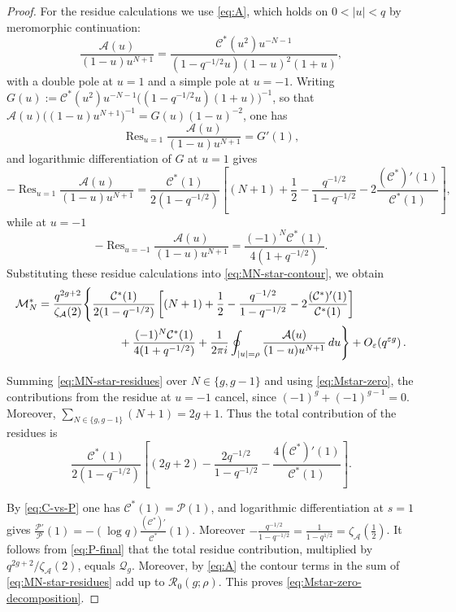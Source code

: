 \documentclass[a4paper,reqno]{amsart}
\numberwithin{equation}{section}
\theoremstyle{remark}
\theoremstyle{definition}
\newcommand{\A}{\mathcal{A}}
\newcommand{\zA}{\zeta_{\A}}
\begin{document}
\begin{proof}
For the residue calculations we use \eqref{eq:A}, which holds on
$0<|u|<q$ by meromorphic continuation:
$$
\frac{\mathcal A(u)}{(1-u)u^{N+1}}
=
\frac{\mathcal C^*(u^2)u^{-N-1}}
{(1-q^{-1/2}u)(1-u)^2(1+u)},
$$
with a double pole at $u=1$ and a simple pole at $u=-1$. Writing
$G(u):=\mathcal C^*(u^2)u^{-N-1}\bigl((1-q^{-1/2}u)(1+u)\bigr)^{-1}$, so
that $\mathcal A(u)\bigl((1-u)u^{N+1}\bigr)^{-1}=G(u)(1-u)^{-2}$, one has
$$
\operatorname{Res}_{u=1}\frac{\mathcal A(u)}{(1-u)u^{N+1}}=G'(1),
$$
and logarithmic differentiation of $G$ at $u=1$ gives
$$
-\operatorname{Res}_{u=1}
\frac{\mathcal A(u)}{(1-u)u^{N+1}}
=
\frac{\mathcal C^*(1)}{2(1-q^{-1/2})}
\left[
(N+1)+\frac12
-\frac{q^{-1/2}}{1-q^{-1/2}}
-2\frac{(\mathcal C^*)'(1)}{\mathcal C^*(1)}
\right],
$$
while at $u=-1$
$$
-\operatorname{Res}_{u=-1}
\frac{\mathcal A(u)}{(1-u)u^{N+1}}
=
\frac{(-1)^N\mathcal C^*(1)}
{4(1+q^{-1/2})}.
$$
Substituting these residue calculations into
\eqref{eq:MN-star-contour}, we obtain
\begin{align}\label{eq:MN-star-residues}
\mathcal M_N^*
&=
\frac{q^{2g+2}}{\zA(2)}
\Biggl\{
\frac{\mathcal C^*(1)}{2(1-q^{-1/2})}
\left[
(N+1)+\frac12
-\frac{q^{-1/2}}{1-q^{-1/2}}
-2\frac{(\mathcal C^*)'(1)}{\mathcal C^*(1)}
\right]
\nonumber\\
&\hspace{25mm}
+
\frac{(-1)^N\mathcal C^*(1)}
{4(1+q^{-1/2})}
+
\frac{1}{2\pi i}
\oint_{|u|=\rho}
\frac{\mathcal A(u)}
{(1-u)u^{N+1}}\,du
\Biggr\}
+
O_\varepsilon\!\left(q^{\varepsilon g}\right).
\end{align}

Summing \eqref{eq:MN-star-residues} over $N\in\{g,g-1\}$ and using
\eqref{eq:Mstar-zero}, the contributions from the residue at $u=-1$
cancel, since $(-1)^g+(-1)^{g-1}=0$. Moreover,
$\sum_{N\in\{g,g-1\}}(N+1)=2g+1$.
Thus the total contribution of the residues is
$$
\frac{\mathcal C^*(1)}{2(1-q^{-1/2})}
\left[
(2g+2)
-\frac{2q^{-1/2}}{1-q^{-1/2}}
-\frac{4(\mathcal C^*)'(1)}{\mathcal C^*(1)}
\right].
$$

By \eqref{eq:C-vs-P} one has $\mathcal C^*(1)=\mathscr P(1)$, and
logarithmic differentiation at $s=1$ gives
$\frac{\mathscr P'}{\mathscr P}(1)=-(\log q)\frac{(\mathcal C^*)'}{\mathcal C^*}(1)$.
Moreover
$-\frac{q^{-1/2}}{1-q^{-1/2}}=\frac{1}{1-q^{1/2}}=\zA\!\left(\tfrac12\right)$.
It follows from \eqref{eq:P-final} that the total residue contribution,
multiplied by $q^{2g+2}/\zA(2)$, equals $\mathcal Q_g$. Moreover, by
\eqref{eq:A} the contour terms in the sum of \eqref{eq:MN-star-residues} add
up to $\mathcal R_0(g;\rho)$. This proves
\eqref{eq:Mstar-zero-decomposition}.
\end{proof}
\end{document}
